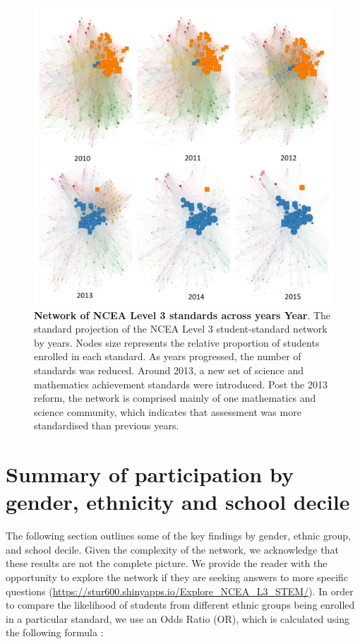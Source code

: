 \documentclass[a4paper]{article}
\begin{document}
\begin{landscape}
\begin{figure}[h]
    \centering
    \includegraphics[width = \textwidth]{L3NCEA_STEM_Network_Year.png}
    \caption{\textbf{Network of NCEA Level 3 standards across years Year}. The standard projection of the NCEA Level 3 student-standard network by years. Nodes size represents the relative proportion of students enrolled in each standard. As years progressed, the number of standards was reduced. Around 2013, a new set of science and mathematics achievement standards were introduced. Post the 2013 reform, the network is comprised mainly of one mathematics and science community, which indicates that assessment was more standardised than previous years.
    }
    
    \label{fig:NetworkDecile}
\end{figure}
\end{landscape}

\section*{Summary of participation by gender, ethnicity and school decile}

The following section outlines some of the key findings by gender, ethnic group, and school decile. Given the complexity of the network, we acknowledge that these results are not the complete picture. We provide the reader with the opportunity to explore the network if they are seeking answers to more specific questions (\url{https://stur600.shinyapps.io/Explore_NCEA_L3_STEM/}).  In order to compare the likelihood of students from different ethnic groups being enrolled in a particular standard, we use an Odds Ratio (OR), which is calculated using the following formula \citep{field2012discovering}: 
\end{document}
